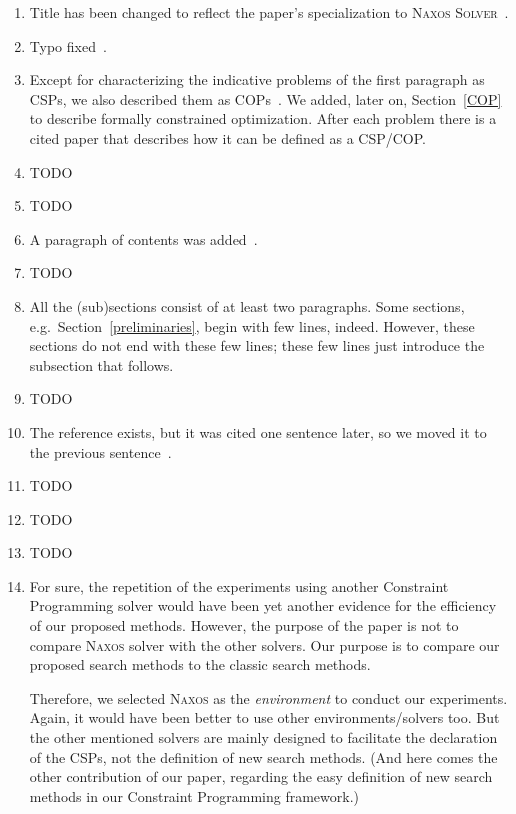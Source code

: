 \documentclass{ws-ijait}
\begin{document}
\begin{enumerate}
  \item Title has been changed to reflect the paper's
        specialization to \textsc{Naxos
        Solver}~.
  \item Typo fixed~.
  \item Except for characterizing the indicative problems of
        the first paragraph as CSPs, we also described them
        as COPs~. We added, later on,
        Section~\ref{COP} to describe formally constrained
        optimization. After each problem there is a cited
        paper that describes how it can be defined as a
        CSP\slash COP.
  \item TODO
  \item TODO
  \item A paragraph of contents was added~.
  \item TODO
  \item All the (sub)sections consist of at least two
        paragraphs. Some sections, e.g.\ 
        Section~\ref{preliminaries}, begin with few lines,
        indeed. However, these sections do not end with
        these few lines; these few lines just introduce the
        subsection that follows.
  \item TODO
  \item The reference exists, but it was cited one sentence
        later, so we moved it to the previous
        sentence~.
  \item TODO
  \item TODO
  \item TODO
  \item For sure, the repetition of the experiments using
        another Constraint Programming solver would have
        been yet another evidence for the efficiency of our
        proposed methods. However, the purpose of the paper
        is not to compare \textsc{Naxos} solver with the
        other solvers. Our purpose is to compare our
        proposed search methods to the classic search
        methods.

        Therefore, we selected \textsc{Naxos} as the
        \emph{environment} to conduct our experiments.
        Again, it would have been better to use other
        environments\slash solvers too. But the other
        mentioned solvers are mainly designed to facilitate
        the declaration of the CSPs, not the definition of
        new search methods. (And here comes the other
        contribution of our paper, regarding the easy
        definition of new search methods in our Constraint
        Programming framework.)
\end{enumerate}
\end{document}
